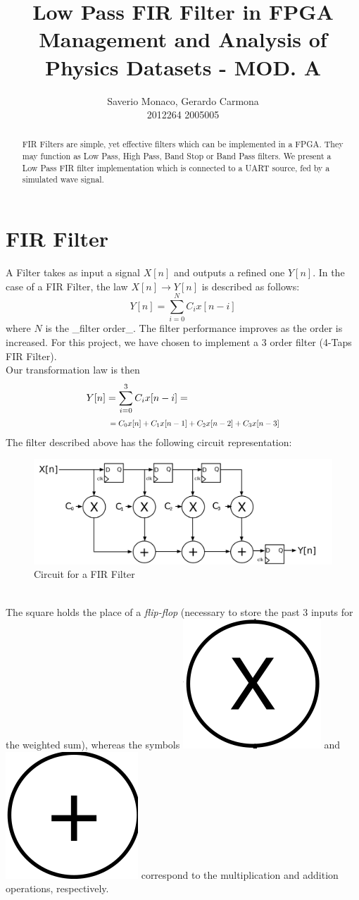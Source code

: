 \documentclass[11pt,a4paper,twocolumn]{IEEEtran}
\author{Saverio Monaco, Gerardo Carmona\\ 2012264\hspace{1.5cm} 2005005\\ \sepline}
\title{\textbf{Low Pass FIR Filter in FPGA}\\ Management and Analysis of Physics Datasets - MOD. A}
\newcommand*{\Scale}[2][4]{\scalebox{#1}{$#2$}}
\begin{document}
	\maketitle
	\begin{abstract}
		FIR Filters are simple, yet effective filters which can be implemented in a FPGA. They may function as Low Pass, High Pass, Band Stop or Band Pass filters. We present a Low Pass FIR filter implementation which is connected to a UART source, fed by a simulated wave signal.
	\end{abstract}
	\section{FIR Filter}
	A Filter takes as input a signal $X[n]$ and outputs a refined one $Y[n]$. In the case of a FIR Filter, the law $X[n]\to Y[n]$ is described as follows: 
	$$ Y[n] = \sum_{i=0}^N C_i x[n-i] $$
	where $N$ is the _filter order_. The filter performance improves as the order is increased. For this project, we have chosen to implement a 3 order filter (4-Taps FIR Filter).\\ Our transformation law is then
	$$\begin{aligned} Y[n]&=\sum_{i=0}^3 C_ix[n-i]=\\ & \Scale[0.8]{\hspace*{.2cm}=C_0x[n]+C_1x[n-1]+C_2x[n-2]+C_3x[n-3]}\end{aligned}$$
	The filter described above has the following circuit representation:
	\begin{figure}[h]
		\centering
		\includegraphics[width=1\linewidth]{img/FIR_direct_svg}
		\caption{Circuit for a FIR Filter}
	\end{figure}\\
	The square holds the place of a \emph{flip-flop} (necessary to store the past 3 inputs for the weighted sum), whereas the symbols \includegraphics[width=0.05\linewidth]{img/x} and \includegraphics[width=0.05\linewidth]{img/+} correspond to the multiplication and addition operations, respectively.
\end{document}
